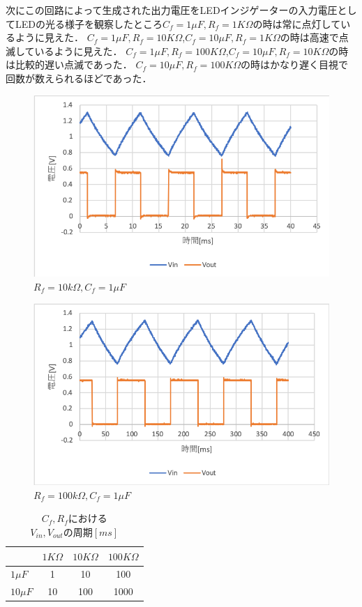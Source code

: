 \documentclass[11pt, a4paper,twocolumn]{jarticle}
\begin{document}
次にこの回路によって生成された出力電圧をLEDインジゲーターの入力電圧としてLEDの光る様子を観察したところ$C_f=1\mu F,R_f=1K\Omega$の時は常に点灯しているように見えた．
$C_f=1\mu F,R_f=10K\Omega$,$C_f=10\mu F,R_f=1K\Omega$の時は高速で点滅しているように見えた．
$C_f=1\mu F,R_f=100K\Omega$,$C_f=10\mu F,R_f=10K\Omega$の時は比較的遅い点滅であった．
$C_f=10\mu F,R_f=100K\Omega$の時はかなり遅く目視で回数が数えられるほどであった．

\begin{figure}[htbp]
 \begin{center}
  \includegraphics[width=0.8\linewidth]{fig17.png}
 \end{center}
 \caption{$R_f=10k\Omega,C_f=1\mu F$}
 \label{fig:17}
\end{figure}

\newpage

\begin{figure}[htbp]
 \begin{center}
  \includegraphics[width=0.8\linewidth]{fig18.png}
 \end{center}
 \caption{$R_f=100k\Omega,C_f=1\mu F$}
 \label{fig:18}
\end{figure}

\begin{table}[htb]
  \begin{center}
    \caption{$C_f,R_f$における$V_{in},V_{out}の周期[ms]$}
    \begin{tabular}{|l|c c c|} \hline
         &$1K\Omega$ & $10K\Omega$ & $100K\Omega$ \\ \hline
      $1\mu F$  & 1 & 10 & 100 \\ \hline
      $10\mu F$ & 10 & 100 & 1000 \\ \hline
    \end{tabular}
    \label{tab:1}
  \end{center}
\end{table}
\end{document}
